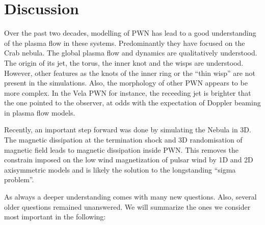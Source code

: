 \section{Discussion}
\label{sec:discussion}

Over the past two decades, modelling of PWN has lead to a good understanding of the plasma flow in these systems. Predominantly they have focused on the Crab nebula.  The global plasma flow and dynamics are qualitatively understood. The origin of its jet, the torus, the inner knot and the wisps are understood. However, other features as the knots of the inner ring or the ``thin wisp'' \cite{Hester_1995} are not present in the simulations. Also, the morphology of other PWN appears to be more complex. In the Vela PWN for instance, the receeding jet is brighter that the one pointed to the observer, at odds with the expectation of Doppler beaming in plasma flow models.

Recently, an important step forward was done by simulating the Nebula in 3D. The magnetic dissipation at the termination shock and 3D randomisation of magnetic field leads to magnetic dissipation  inside PWN. This removes the constrain imposed on the low wind magnetization of pulsar wind by 1D and 2D axisymmetric models and is likely the solution to the longstanding ``sigma problem''.

As always a deeper understanding comes with many new questions. Also, several older questions remained unanswered. We will summarize the ones we consider most important in the following: 

